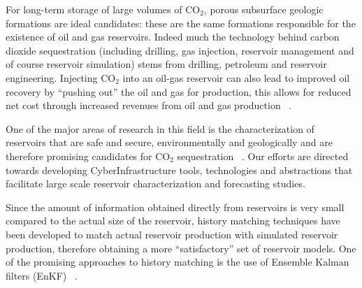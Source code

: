 \documentclass[a4paper,10pt]{article}
\begin{document}
For long-term storage of large volumes of CO$_2$, porous subsurface geologic formations are ideal candidates: these are the same formations responsible for the existence of oil and gas reservoirs. Indeed much the technology behind carbon dioxide sequestration (including drilling, gas injection, reservoir management and of course reservoir simulation) stems from drilling, petroleum and reservoir engineering. Injecting CO$_2$ into an oil-gas reservoir can also lead to improved oil recovery by ``pushing out'' the oil and gas for production, this allows for reduced net cost through increased revenues from oil and gas production ~\cite{EORBook}.


One of the major areas of research in this field is the characterization of reservoirs that are safe and secure, environmentally and geologically and are therefore promising candidates for CO$_2$ sequestration ~\cite{GeoRPT,Luigi}. Our efforts are directed towards developing CyberInfrastructure tools, technologies and abstractions that facilitate large scale reservoir characterization and forecasting studies.

Since the amount of information obtained directly from reservoirs is very small compared to the actual size of the reservoir, history matching techniques have been developed to match actual reservoir production with simulated reservoir production, therefore obtaining a more ``satisfactory'' set of reservoir models. One of the promising approaches to history matching is the use of Ensemble Kalman filters (EnKF) ~\cite{KalmanPaper, DO2007, LiEnKF07, DO2006}.
\end{document}
